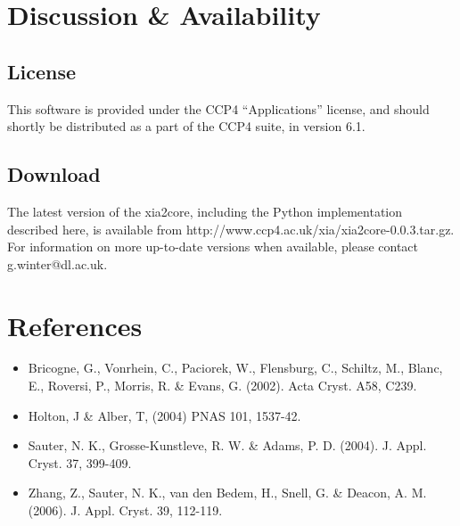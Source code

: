 \documentclass[a4paper, 11pt]{article}
\begin{document}
  

\section{Discussion \& Availability}

\subsection{License}

This software is provided under the CCP4 ``Applications'' license, and
should shortly be distributed as a part of the CCP4 suite, in version 6.1.

\subsection{Download}

The latest version of the xia2core, including the Python implementation
described here, is available from 
http://www.ccp4.ac.uk/xia/xia2core-0.0.3.tar.gz. For information on
more up-to-date versions when available, please contact g.winter@dl.ac.uk.

\section{References}

\begin{itemize}
\item{Bricogne, G., Vonrhein, C., Paciorek, W., Flensburg, C., Schiltz, M., 
Blanc, E., Roversi, P., Morris, R. \& Evans, G. (2002). Acta Cryst. A58, C239.}

\item{Holton, J \& Alber, T, (2004) PNAS 101, 1537-42.}

\item{Sauter, N. K., Grosse-Kunstleve, R. W. \& Adams, P. D. (2004). 
J. Appl. Cryst. 37, 399-409.}

\item{Zhang, Z., Sauter, N. K., van den Bedem, H., Snell, G. \& 
Deacon, A. M. (2006). J. Appl. Cryst. 39, 112-119.}
\end{itemize}
\end{document}
